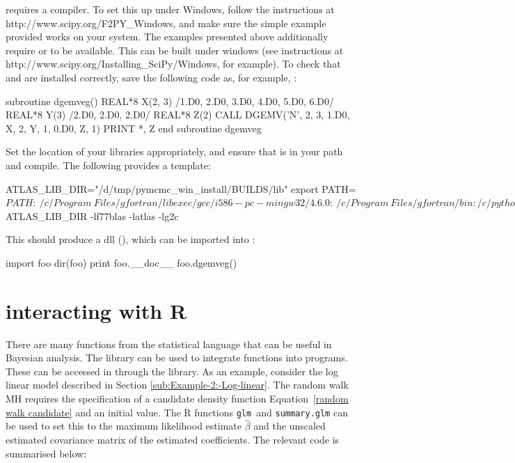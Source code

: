 \documentclass[article]{jss}
\begin{document}
 requires a  compiler. To set this up
under Windows, follow the instructions at
http://www.scipy.org/F2PY\_Windows, and make sure the simple example
provided works on your system. The examples presented above
additionally require  or \mbox{} to be available.
This can be built under windows (see instructions at \linebreak
http://www.scipy.org/Installing\_SciPy/Windows, for example). To check
that  and \mbox{} are installed correctly, save
the following code as, for example, :


\begin{Code}
subroutine dgemveg()
  REAL*8 X(2, 3) /1.D0, 2.D0, 3.D0, 4.D0, 5.D0, 6.D0/
  REAL*8 Y(3) /2.D0, 2.D0, 2.D0/
  REAL*8 Z(2)
  CALL DGEMV('N', 2, 3, 1.D0, X, 2, Y, 1, 0.D0, Z, 1)
  PRINT *, Z
end subroutine dgemveg
\end{Code}



Set the location of your  libraries appropriately, and ensure
that  is in your path and compile. The following provides a
template:


\begin{Code}
ATLAS_LIB_DIR="/d/tmp/pymcmc_win_install/BUILDS/lib"
export PATH=${PATH}:\
/c/Program\ Files/gfortran/libexec/gcc/i586-pc-mingw32/4.6.0:\
/c/Program\ Files/gfortran/bin:/c/python26 
python /c/Python26/Scripts/f2py.py -c -m foo \
   --fcompiler=gfortran \
   blas_eg.f90 -L${ATLAS_LIB_DIR} -lf77blas -latlas -lg2c 
\end{Code}


This should produce a  dll (\code{foo.pyd}), which can be imported
into \proglang{Python}:


\begin{Code}
import foo
dir(foo) 
print foo.__doc__
foo.dgemveg() 
\end{Code}

\section[PyMCMC interacting with R]{ interacting with R}
\label{sec:PyMCMC-interacting-with}

There are many functions from the  statistical language
\citep{R} that can be useful in Bayesian analysis. The \pkg{RPy2}
\citep{gautier:_rpy2}  library can be used to
integrate  functions into  programs. These can
be accessed in \pkg{PyMCMC} through the \pkg{RPy2} \proglang{Python}
library. As an example, consider the log linear model described in
Section \ref{sub:Example-2:-Log-linear}. The random walk MH requires
the specification of a candidate density function
Equation~\ref{random walk candidate} and an initial value. The R
functions \texttt{glm }and \texttt{summary.glm} can be used to set
this to the maximum likelihood estimate $\hat{\beta}$ and the unscaled
estimated covariance matrix of the estimated coefficients. The
relevant code is summarised below:
\end{document}
